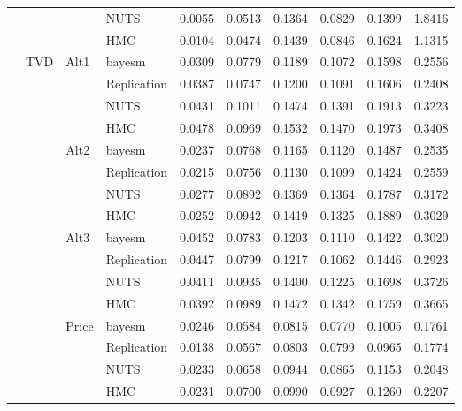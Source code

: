 \begin{longtable}{clllcccccc}
 &  &  & NUTS & 0.0055 & 0.0513 & 0.1364 & 0.0829 & 0.1399 & 1.8416 \\
 &  &  & HMC & 0.0104 & 0.0474 & 0.1439 & 0.0846 & 0.1624 & 1.1315 \\
 & TVD & Alt1 & bayesm & 0.0309 & 0.0779 & 0.1189 & 0.1072 & 0.1598 & 0.2556 \\
 &  &  & Replication & 0.0387 & 0.0747 & 0.1200 & 0.1091 & 0.1606 & 0.2408 \\
 &  &  & NUTS & 0.0431 & 0.1011 & 0.1474 & 0.1391 & 0.1913 & 0.3223 \\
 &  &  & HMC & 0.0478 & 0.0969 & 0.1532 & 0.1470 & 0.1973 & 0.3408 \\
 &  & Alt2 & bayesm & 0.0237 & 0.0768 & 0.1165 & 0.1120 & 0.1487 & 0.2535 \\
 &  &  & Replication & 0.0215 & 0.0756 & 0.1130 & 0.1099 & 0.1424 & 0.2559 \\
 &  &  & NUTS & 0.0277 & 0.0892 & 0.1369 & 0.1364 & 0.1787 & 0.3172 \\
 &  &  & HMC & 0.0252 & 0.0942 & 0.1419 & 0.1325 & 0.1889 & 0.3029 \\
 &  & Alt3 & bayesm & 0.0452 & 0.0783 & 0.1203 & 0.1110 & 0.1422 & 0.3020 \\
 &  &  & Replication & 0.0447 & 0.0799 & 0.1217 & 0.1062 & 0.1446 & 0.2923 \\
 &  &  & NUTS & 0.0411 & 0.0935 & 0.1400 & 0.1225 & 0.1698 & 0.3726 \\
 &  &  & HMC & 0.0392 & 0.0989 & 0.1472 & 0.1342 & 0.1759 & 0.3665 \\
 &  & Price & bayesm & 0.0246 & 0.0584 & 0.0815 & 0.0770 & 0.1005 & 0.1761 \\
 &  &  & Replication & 0.0138 & 0.0567 & 0.0803 & 0.0799 & 0.0965 & 0.1774 \\
 &  &  & NUTS & 0.0233 & 0.0658 & 0.0944 & 0.0865 & 0.1153 & 0.2048 \\
 &  &  & HMC & 0.0231 & 0.0700 & 0.0990 & 0.0927 & 0.1260 & 0.2207 \\
\end{longtable}
